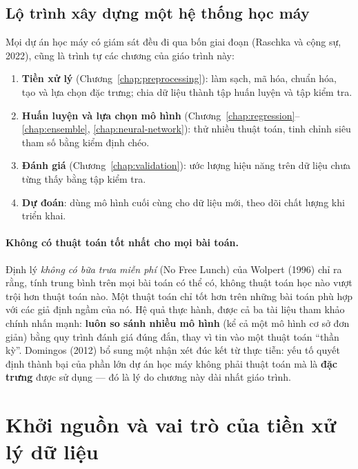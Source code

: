 \subsection{Lộ trình xây dựng một hệ thống học máy}

Mọi dự án học máy có giám sát đều đi qua bốn giai đoạn (Raschka và cộng sự, 2022), cũng là trình tự các chương của giáo trình này:
\begin{enumerate}
    \item \textbf{Tiền xử lý} (Chương~\ref{chap:preprocessing}): làm sạch, mã hóa, chuẩn hóa, tạo và lựa chọn đặc trưng; chia dữ liệu thành tập huấn luyện và tập kiểm tra.
    \item \textbf{Huấn luyện và lựa chọn mô hình} (Chương~\ref{chap:regression}--\ref{chap:ensemble}, \ref{chap:neural-network}): thử nhiều thuật toán, tinh chỉnh siêu tham số bằng kiểm định chéo.
    \item \textbf{Đánh giá} (Chương~\ref{chap:validation}): ước lượng hiệu năng trên dữ liệu chưa từng thấy bằng tập kiểm tra.
    \item \textbf{Dự đoán}: dùng mô hình cuối cùng cho dữ liệu mới, theo dõi chất lượng khi triển khai.
\end{enumerate}


\paragraph{Không có thuật toán tốt nhất cho mọi bài toán.} Định lý \textit{không có bữa trưa miễn phí} (No Free Lunch) của Wolpert (1996) chỉ ra rằng, tính trung bình trên mọi bài toán có thể có, không thuật toán học nào vượt trội hơn thuật toán nào. Một thuật toán chỉ tốt hơn trên những bài toán phù hợp với các giả định ngầm của nó. Hệ quả thực hành, được cả ba tài liệu tham khảo chính nhấn mạnh: \textbf{luôn so sánh nhiều mô hình} (kể cả một mô hình cơ sở đơn giản) bằng quy trình đánh giá đúng đắn, thay vì tin vào một thuật toán ``thần kỳ''. Domingos (2012) bổ sung một nhận xét đúc kết từ thực tiễn: yếu tố quyết định thành bại của phần lớn dự án học máy không phải thuật toán mà là \textbf{đặc trưng} được sử dụng --- đó là lý do chương này dài nhất giáo trình.

\section{Khởi nguồn và vai trò của tiền xử lý dữ liệu}

